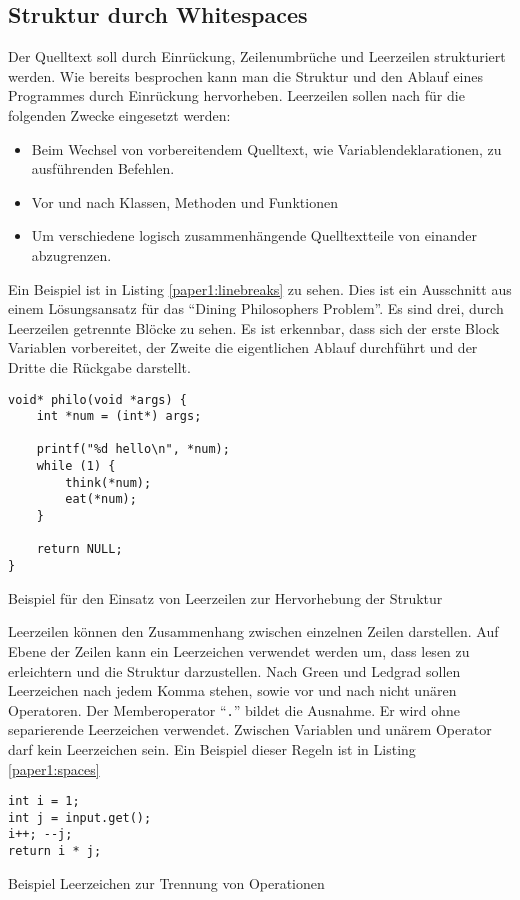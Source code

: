 \subsection{Struktur durch Whitespaces}
Der Quelltext soll durch Einrückung, Zeilenumbrüche und Leerzeilen strukturiert werden. Wie bereits besprochen kann man die Struktur und den Ablauf eines Programmes durch Einrückung hervorheben. Leerzeilen sollen nach \cite[S. 6f.]{Green} für die folgenden Zwecke eingesetzt werden:
\begin{itemize}
\item Beim Wechsel von vorbereitendem Quelltext, wie Variablendeklarationen, zu ausführenden Befehlen.
\item Vor und nach Klassen, Methoden und Funktionen
\item Um verschiedene logisch zusammenhängende Quelltextteile von einander abzugrenzen.
\end{itemize}
Ein Beispiel ist in Listing \ref{paper1:linebreaks} zu sehen. Dies ist ein Ausschnitt aus einem Lösungsansatz für das \enquote{Dining Philosophers Problem}\cite{Chandy}. Es sind drei, durch Leerzeilen getrennte Blöcke zu sehen. Es ist erkennbar, dass sich der erste Block Variablen vorbereitet, der Zweite die eigentlichen Ablauf durchführt und der Dritte die Rückgabe darstellt.
\begin{listing}[H]
\begin{verbatim}
void* philo(void *args) {
    int *num = (int*) args;

    printf("%d hello\n", *num);
    while (1) {
        think(*num);
        eat(*num);
    }

    return NULL;
}
\end{verbatim}
\label{paper1:linebreaks}
\caption{Beispiel für den Einsatz von Leerzeilen zur Hervorhebung der Struktur}
\end{listing}

Leerzeilen können den Zusammenhang zwischen einzelnen Zeilen darstellen. Auf Ebene der Zeilen kann ein Leerzeichen verwendet werden um, dass lesen zu erleichtern und die Struktur darzustellen.
Nach Green und Ledgrad\cite[S. 7]{Green} sollen Leerzeichen nach jedem Komma stehen, sowie vor und nach nicht unären Operatoren. Der Memberoperator \enquote{\texttt{.}} bildet die Ausnahme. Er wird ohne separierende Leerzeichen verwendet. Zwischen Variablen und unärem Operator darf kein Leerzeichen sein. Ein Beispiel dieser Regeln ist in Listing \ref{paper1:spaces} 

\begin{listing}[H]
    \begin{verbatim}
int i = 1;
int j = input.get();
i++; --j;
return i * j;
    \end{verbatim}
    \label{paper1:spaces}
    \caption{Beispiel Leerzeichen zur Trennung von Operationen}
\end{listing}


